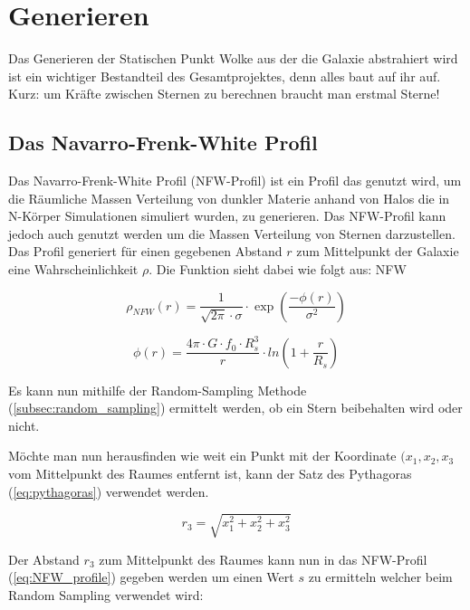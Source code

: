 \section{Generieren}

Das Generieren der Statischen Punkt Wolke aus der die Galaxie abstrahiert wird
ist ein wichtiger Bestandteil des Gesamtprojektes, denn alles baut auf ihr auf.
Kurz: um Kräfte zwischen Sternen zu berechnen braucht man erstmal Sterne!

\subsection{Das Navarro-Frenk-White Profil}
Das Navarro-Frenk-White Profil (NFW-Profil) ist ein Profil das genutzt wird, um
die Räumliche Massen Verteilung von dunkler Materie anhand von Halos die in
N-Körper Simulationen simuliert wurden, zu generieren. Das NFW-Profil kann
jedoch auch genutzt werden um die Massen Verteilung von Sternen darzustellen.
Das Profil generiert für einen gegebenen Abstand \( r \) zum Mittelpunkt der
Galaxie eine Wahrscheinlichkeit \( \rho \). Die Funktion sieht dabei wie folgt aus:
NFW

\begin{equation} \label{eq:NFW_profile}
  \rho_{NFW}(r) = \frac{ 1 }{ \sqrt{ 2 \pi } \cdot \sigma } \cdot
  \exp \left( \frac{ -\phi(r) }{ \sigma^{ 2 } } \right)
\end{equation}

\begin{equation*}
  \phi(r) = \frac{ 4\pi \cdot G \cdot f_{0} \cdot R_{s}^3 }{ r } \cdot
  ln{ \left( 1 + \frac{ r }{ R_{s} } \right) }
\end{equation*}

Es kann nun mithilfe der Random-Sampling Methode (\ref{subsec:random_sampling})
ermittelt werden, ob ein Stern beibehalten wird oder nicht.

\par Möchte man nun herausfinden wie weit ein Punkt mit der Koordinate \(
(x_{1}, x_{2}, x_{3} \) vom Mittelpunkt des Raumes entfernt ist, kann der Satz
des Pythagoras (\ref{eq:pythagoras}) verwendet werden.

\begin{equation} \label{eq:pythagoras}
    r_{3} = \sqrt{x_{1}^{2} + x_{2}^{2} + x_{3}^{2} }
\end{equation}

Der Abstand \( r_{3} \) zum Mittelpunkt des Raumes kann nun in das NFW-Profil
(\ref{eq:NFW_profile}) gegeben werden um einen Wert \( s \) zu ermitteln welcher
beim Random Sampling verwendet wird:

